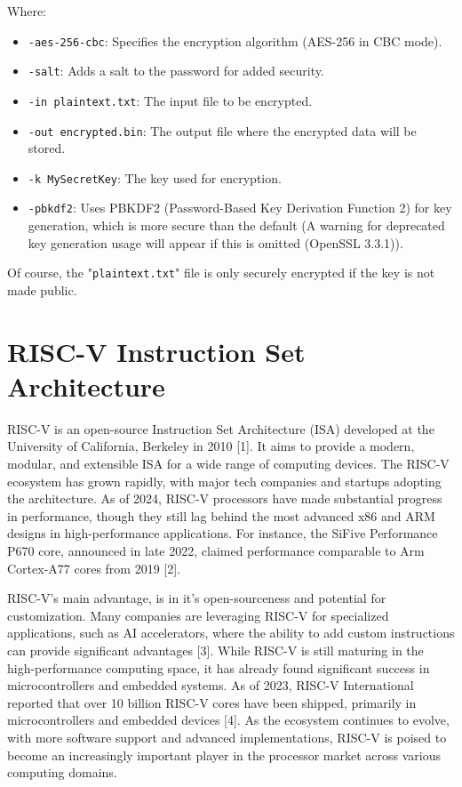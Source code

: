 Where:
\begin{itemize}
    \item \texttt{-aes-256-cbc}: Specifies the encryption algorithm (AES-256 in CBC mode).
    \item \texttt{-salt}: Adds a salt to the password for added security.
    \item \texttt{-in plaintext.txt}: The input file to be encrypted.
    \item \texttt{-out encrypted.bin}: The output file where the encrypted data will be stored.
    \item \texttt{-k MySecretKey}: The key used for encryption.
    \item \texttt{-pbkdf2}: Uses PBKDF2 (Password-Based Key Derivation Function 2) for key generation, which is more secure than the default (A warning for deprecated key generation usage will appear if this is omitted (OpenSSL 3.3.1)).
\end{itemize}
Of course, the "\texttt{plaintext.txt}" file is only securely encrypted if the key is not made public.
\section{RISC-V Instruction Set Architecture}
RISC-V is an open-source Instruction Set Architecture (ISA) developed at the University of California, Berkeley in 2010 [1]. It aims to provide a modern, modular, and extensible ISA for a wide range of computing devices. The RISC-V ecosystem has grown rapidly, with major tech companies and startups adopting the architecture. As of 2024, RISC-V processors have made substantial progress in performance, though they still lag behind the most advanced x86 and ARM designs in high-performance applications. For instance, the SiFive Performance P670 core, announced in late 2022, claimed performance comparable to Arm Cortex-A77 cores from 2019 [2].

RISC-V's main advantage, is in it's open-sourceness and potential for customization. Many companies are leveraging RISC-V for specialized applications, such as AI accelerators, where the ability to add custom instructions can provide significant advantages [3]. While RISC-V is still maturing in the high-performance computing space, it has already found significant success in microcontrollers and embedded systems. As of 2023, RISC-V International reported that over 10 billion RISC-V cores have been shipped, primarily in microcontrollers and embedded devices [4]. As the ecosystem continues to evolve, with more software support and advanced implementations, RISC-V is poised to become an increasingly important player in the processor market across various computing domains.

